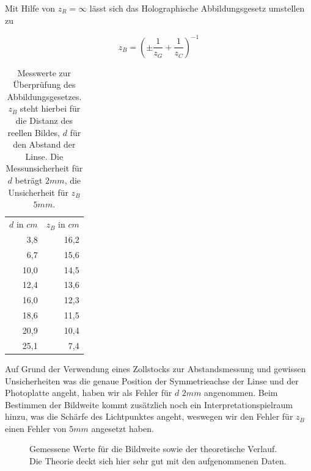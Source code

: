 \documentclass[bigchapter,colorback,accentcolor=tud4b,linedtoc,11pt]{tudreport}
\begin{document}
Mit Hilfe von $z_R = \infty$ lässt sich das Holographische Abbildungsgesetz
umstellen zu 

$$z_B = \left(\pm\frac{1}{z_G}+\frac{1}{z_C}\right)^{-1}$$

\begin{table}[H]
  \begin{center}
  \begin{tabular}{r|r}
    $d$ in $cm$ & $z_B$ in $cm$ \\ \hhline{=|=}
    3,8         & 16,2          \\ \hline
    6,7         & 15,6          \\ \hline
    10,0        & 14,5          \\ \hline
    12,4        & 13,6          \\ \hline
    16,0        & 12,3          \\ \hline
    18,6        & 11,5          \\ \hline
    20,9        & 10,4          \\ \hline
    25,1        & 7,4           \\
	\end{tabular}
    \caption{Messwerte zur Überprüfung des Abbildungsgesetzes. $z_B$ steht
      hierbei für die Distanz des reellen Bildes, $d$ für den Abstand der
      Linse. Die Messunsicherheit für $d$ beträgt $2mm$, die Unsicherheit für
      $z_B$ $5mm$.}
  \end{center}
\end{table}

Auf Grund der Verwendung eines Zollstocks zur Abstandsmessung und gewissen
Unsicherheiten was die genaue Position der Symmetrieachse der Linse und der
Photoplatte angeht, haben wir als Fehler für $d$ $2 mm$ angenommen. Beim
Bestimmen der Bildweite kommt zusätzlich noch ein Interpretationspielraum
hinzu, was die Schärfe des Lichtpunktes angeht, weswegen wir den Fehler für
$z_B$ einen Fehler von $5mm$ angesetzt haben.

\begin{figure}[H]
    \caption{Gemessene Werte für die Bildweite sowie der theoretische
      Verlauf. Die Theorie deckt sich hier sehr gut mit den
      aufgenommenen Daten.}
\end{figure}
\end{document}
